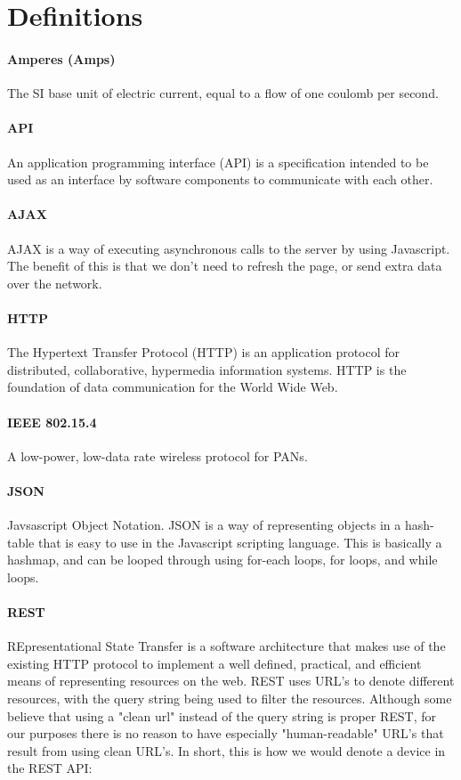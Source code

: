 
\section{Definitions}

\paragraph{Amperes (Amps)}
The SI base unit of electric current, equal to a flow of one coulomb per second.

\paragraph{API}
An application programming interface (API) is a specification intended to be used as an interface by software components to communicate with each other.

\paragraph{AJAX}
AJAX is a way of executing asynchronous calls to the server by using Javascript. 
The benefit of this is that we don't need to refresh the page, or send extra data over the network.

\paragraph{HTTP}
The Hypertext Transfer Protocol (HTTP) is an application protocol for distributed, collaborative, hypermedia information systems. 
HTTP is the foundation of data communication for the World Wide Web.

\paragraph{IEEE 802.15.4}
A low-power, low-data rate wireless protocol for \ac{PAN}s.

\paragraph{JSON}
Javsascript Object Notation. 
JSON is a way of representing objects in a hash-table that is easy to use in the Javascript scripting language. 
This is basically a hashmap, and can be looped through using for-each loops, for loops, and while loops.

\paragraph{REST}
REpresentational State Transfer is a software architecture that makes use of the existing HTTP protocol to implement a well defined, practical, and efficient means of representing resources on the web.
REST uses URL's to denote different resources, with the query string being used to filter the resources. 
Although some believe that using a "clean url" instead of the query string is proper REST, for our purposes there is no reason to have especially "human-readable" URL's that result from using clean URL's.
In short, this is how we would denote a device in the REST API:

